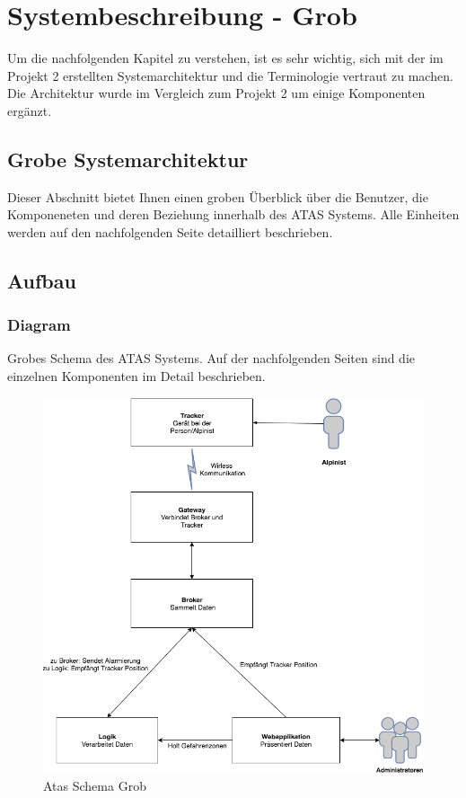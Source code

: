 \documentclass[11pt,english,german]{report}
\theoremstyle{definition}
\begin{document}
\chapter{Systembeschreibung - Grob}
Um die nachfolgenden Kapitel zu verstehen, ist es sehr wichtig, sich mit der im Projekt 2 erstellten Systemarchitektur und die Terminologie vertraut zu machen. Die Architektur wurde im Vergleich zum Projekt 2 um einige Komponenten ergänzt.

\section{Grobe Systemarchitektur}
Dieser Abschnitt bietet Ihnen einen groben Überblick über die Benutzer, die Komponeneten und deren Beziehung innerhalb des ATAS Systems. Alle Einheiten werden auf den nachfolgenden Seite detailliert beschrieben.

\newpage
\section{Aufbau}
\subsection{Diagram}
Grobes Schema des ATAS Systems. Auf der nachfolgenden Seiten sind die einzelnen Komponenten im Detail beschrieben.\\[0.3cm]
\begin{figure}[H]
	\centering
	\includegraphics[width=\textwidth]{img/system/ATAS_SystemOverview_Abstract_BA.png}
	\caption[Atas Schema Grob]
	{Atas Schema Grob}
\end{figure}
\end{document}
